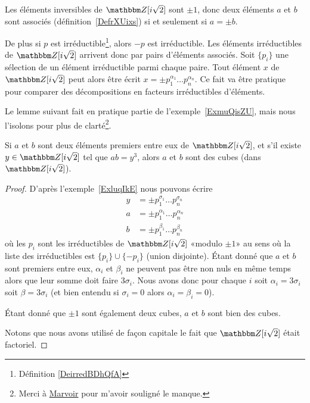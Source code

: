 \begin{example} \label{ExluqIkE}
    Les éléments inversibles de \( \eZ[i\sqrt{2}]\) sont \( \pm 1\), donc deux éléments \( a\) et \( b\) sont associés (définition~\ref{DefrXUixs}) si et seulement si \( a=\pm b\).

    De plus si \( p\) est irréductible\footnote{Définition \ref{DeirredBDhQfA}}, alors \( -p\) est irréductible. Les éléments irréductibles de \( \eZ[i\sqrt{2}]\) arrivent donc par pairs d'éléments associés. Soit \( \{ p_i \}\) une sélection de un élément irréductible parmi chaque paire. Tout élément \( x\) de \( \eZ[i\sqrt{2}]\) peut alors être écrit \( x=\pm p_1^{\alpha_1}\ldots p_n^{\alpha_n}\). Ce fait va être pratique pour comparer des décompositions en facteurs irréductibles d'éléments.
\end{example}

Le lemme suivant fait en pratique partie de l'exemple~\ref{ExmuQisZU}, mais nous l'isolons pour plus de clarté\footnote{Merci à \href{http://fr.wikipedia.org/wiki/Utilisateur:Marvoir}{Marvoir} pour m'avoir souligné le manque.}.
\begin{lemma}       \label{LemTScCIv}
    Si \( a\) et \( b\) sont deux éléments premiers entre eux de \( \eZ[i\sqrt{2}]\), et s'il existe \( y \in  \eZ[i\sqrt{2}]\) tel que \( ab=y^3\), alors \( a\) et \( b\) sont des cubes (dans \( \eZ[i\sqrt{2}]\)).
\end{lemma}

\begin{proof}
    D'après l'exemple~\ref{ExluqIkE} nous pouvons écrire
    \begin{subequations}
        \begin{align}
            y&=\pm p_1^{\sigma_1}\ldots p_n^{\sigma_n}\\
            a&=\pm p_1^{\alpha_1}\ldots p_n^{\alpha_n}\\
            b&=\pm p_1^{\beta_1}\ldots p_n^{\beta_n}
        \end{align}
    \end{subequations}
    où les \( p_i\) sont les irréductibles de \( \eZ[i\sqrt{2}]\) «modulo \( \pm 1\)» au sens où la liste des irréductibles est \( \{ p_i \}\cup\{ -p_i \}\) (union disjointe). Étant donné que \( a\) et \( b\) sont premiers entre eux, \( \alpha_i\) et \( \beta_i\) ne peuvent pas être non nuls en même temps alors que leur somme doit faire \( 3\sigma_i\). Nous avons donc pour chaque \( i\) soit \( \alpha_i=3\sigma_i\) soit \( \beta=3\sigma_i\) (et bien entendu si \( \sigma_i=0\) alors \( \alpha_i=\beta_i=0\)).

    Étant donné que \( \pm 1\) sont également deux cubes, \( a\) et \( b\) sont bien des cubes.

    Notons que nous avons utilisé de façon capitale le fait que \( \eZ[i\sqrt{2}]\) était factoriel.
\end{proof}


